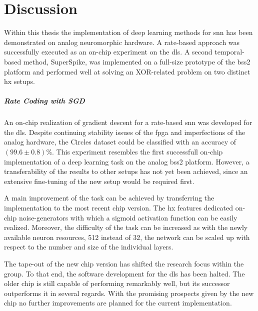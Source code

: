 \chapter{Discussion}
Within this thesis the implementation of deep learning methods for \gls{snn} has been demonstrated on analog neuromorphic hardware. A rate-based approach was successfully executed as an on-chip experiment on the \gls{dls}. A second temporal-based method, SuperSpike, was implemented on a full-size prototype of the \gls{bss2} platform and performed well at solving an XOR-related problem on two distinct \gls{hx} setups.

\paragraph{Rate Coding with SGD} An on-chip realization of gradient descent for a rate-based \gls{snn} was developed for the \gls{dls}. Despite continuing stability issues of the \gls{fpga} and imperfections of the analog hardware, the Circles dataset could be classified with an accuracy of $(99.6 \pm 0.8) \%$. This experiment resembles the first successfull on-chip implementation of a deep learning task on the analog \gls{bss2} platform. However, a transferability of the results to other setups has not yet been achieved, since an extensive fine-tuning of the new setup would be required first.

A main improvement of the task can be achieved by transferring the implementation to the most recent chip version. The \gls{hx} features dedicated on-chip noise-generators with which a sigmoid activation function can be easily realized. Moreover, the difficulty of the task can be increased as with the newly available neuron resources, 512 instead of 32, the network can be scaled up with respect to the number and size of the individual layers.

The tape-out of the new chip version has shifted the research focus within the group. To that end, the software development for the \gls{dls} has been halted. The older chip is still capable of performing remarkably well, but its successor outperforms it in several regards. With the promising prospects given by the new chip no further improvements are planned for the current implementation.

